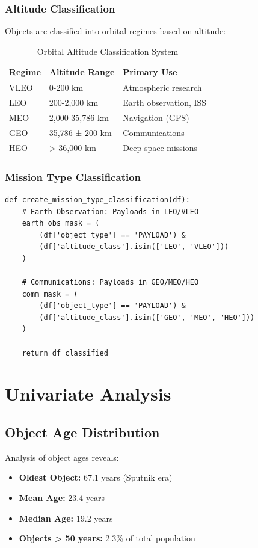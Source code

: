 \documentclass[12pt,a4paper]{article}
\begin{document}
\subsubsection{Altitude Classification}
Objects are classified into orbital regimes based on altitude:

\begin{table}[H]
\centering
\begin{tabular}{@{}lll@{}}
\toprule
\textbf{Regime} & \textbf{Altitude Range} & \textbf{Primary Use} \\
\midrule
VLEO & 0-200 km & Atmospheric research \\
LEO & 200-2,000 km & Earth observation, ISS \\
MEO & 2,000-35,786 km & Navigation (GPS) \\
GEO & 35,786 ± 200 km & Communications \\
HEO & > 36,000 km & Deep space missions \\
\bottomrule
\end{tabular}
\caption{Orbital Altitude Classification System}
\end{table}

\subsubsection{Mission Type Classification}
\begin{lstlisting}[caption=Mission Type Proxy Classification]
def create_mission_type_classification(df):
    # Earth Observation: Payloads in LEO/VLEO
    earth_obs_mask = (
        (df['object_type'] == 'PAYLOAD') & 
        (df['altitude_class'].isin(['LEO', 'VLEO']))
    )
    
    # Communications: Payloads in GEO/MEO/HEO
    comm_mask = (
        (df['object_type'] == 'PAYLOAD') & 
        (df['altitude_class'].isin(['GEO', 'MEO', 'HEO']))
    )
    
    return df_classified
\end{lstlisting}

\section{Univariate Analysis}

\subsection{Object Age Distribution}
Analysis of object ages reveals:
\begin{itemize}
    \item \textbf{Oldest Object:} 67.1 years (Sputnik era)
    \item \textbf{Mean Age:} 23.4 years
    \item \textbf{Median Age:} 19.2 years
    \item \textbf{Objects > 50 years:} 2.3\% of total population
\end{itemize}
\end{document}
